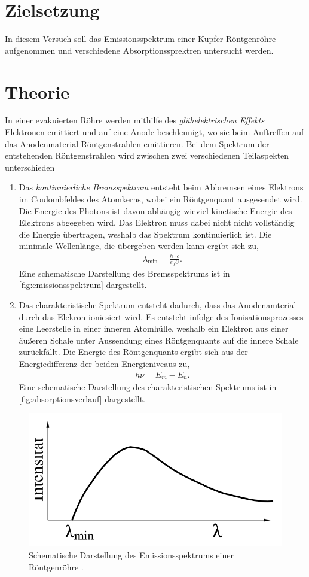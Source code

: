 \section{Zielsetzung}
\label{sec:ziel}
In diesem Versuch soll das Emissionsspektrum einer Kupfer-Röntgenröhre aufgenommen und verschiedene Absorptionssprektren untersucht werden.

\section{Theorie}
\label{sec:Theorie}
In einer evakuierten Röhre werden mithilfe des \textit{glühelektrischen Effekts} Elektronen emittiert und auf eine Anode beschleunigt, wo sie beim Auftreffen
auf das Anodenmaterial Röntgenstrahlen emittieren. Bei dem Spektrum der entstehenden Röntgenstrahlen wird zwischen zwei verschiedenen Teilaspekten unterschieden
\begin{enumerate}
    \item Das \textit{kontinuierliche Bremsspektrum} entsteht beim Abbremsen eines Elektrons im Coulombfeldes des Atomkerns, wobei ein Röntgenquant ausgesendet wird. Die Energie des Photons
    ist davon abhängig wieviel kinetische Energie des Elektrons abgegeben wird. Das Elektron muss dabei nicht nicht vollständig die Energie übertragen, weshalb das Spektrum kontinuierlich ist.
    Die minimale Wellenlänge, die übergeben werden kann ergibt sich zu,
    \begin{align}
        \label{eqn:wellenlaenge}
        \lambda_{\text{min}} = \frac{h\cdot c}{e_0 U}.
    \end{align}
    Eine schematische Darstellung des Bremsspektrums ist in \autoref{fig:emissionsspektrum} dargestellt.
    \item Das charakteristische Spektrum entsteht dadurch, dass das Anodenamterial durch das Elekron ioniesiert wird. Es entsteht infolge des Ionisationsprozesses eine Leerstelle in einer inneren
    Atomhülle, weshalb ein Elektron aus einer äußeren Schale unter Aussendung eines Röntgenquants auf die innere Schale zurückfällt. Die Energie des Röntgenquants ergibt sich aus der Energiedifferenz
    der beiden Energieniveaus zu,
    \begin{align}
        \label{eqn:energiedifferenz}
        h \nu = E_m - E_n.
    \end{align}
    Eine schematische Darstellung des charakteristischen Spektrums ist in \autoref{fig:absorptionsverlauf} dargestellt.
\end{enumerate}
\begin{figure}[H]
    \centering
    \includegraphics[width = 0.5 \textwidth]{data/emissionsspektrum.png}
    \caption{Schematische Darstellung des Emissionsspektrums einer Röntgenröhre \cite{Anleitung602}.}
    \label{fig:emissionsspektrum}
\end{figure}
